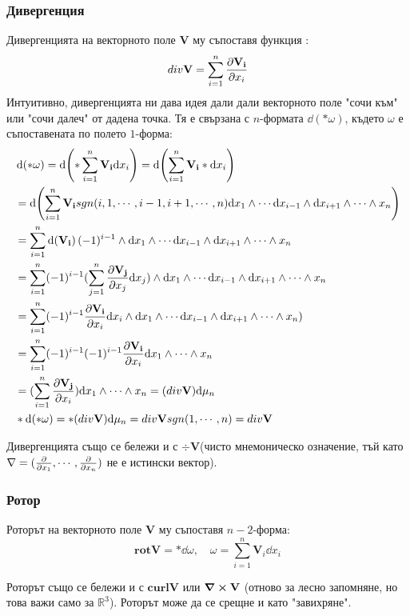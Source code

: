 \documentclass[12pt]{article}
\begin{document}
\begin{large}
\subsubsection*{Дивергенция}
Дивергенцията на векторното поле $\mathbf{V}$ му съпоставя функция :
\[
div \mathbf{V} = \sum_{i=1}^{n} \pdv{\mathbf{V_i}}{x_i}
\] 
Интуитивно, дивергенцията ни дава идея дали дали векторното поле "сочи към" или "сочи далеч" от дадена точка. Тя е свързана с $n$-формата $\dd (\ast \omega)$, където $\omega$ е съпоставената по полето $1$-форма:
\begin{align*}
&\dd (\ast \omega) = \dd ( \ast \sum_{i=1}^{n} \mathbf{V_i} \dd x_i ) = \dd( \sum_{i=1}^{n} \mathbf{V_i} \ast \dd x_i ) \\
&= \dd(\sum_{i=1}^{n} \mathbf{V_i} sgn(i,1,\cdots,i-1,i+1,\cdots,n) \dd x_1 \wedge \cdots \dd x_{i-1} \wedge \dd x_{i+1} \wedge \cdots \wedge x_n) \\
&=\sum_{i=1}^{n} \dd(\mathbf{V_i}) (-1)^{i-1} \wedge \dd x_1 \wedge \cdots \dd x_{i-1} \wedge \dd x_{i+1} \wedge \cdots \wedge x_n \\
&=\sum_{i=1}^{n} (-1)^{i-1}  (\sum_{j=1}^{n} \pdv{\mathbf{V_j}}{x_j} \dd x_j ) \wedge \dd x_1 \wedge \cdots \dd x_{i-1} \wedge \dd x_{i+1} \wedge \cdots \wedge x_n \\
&=\sum_{i=1}^{n} (-1)^{i-1} \pdv{\mathbf{V_i}}{x_i} \dd x_i  \wedge \dd x_1 \wedge \cdots \dd x_{i-1} \wedge \dd x_{i+1} \wedge \cdots \wedge x_n) \\
&=\sum_{i=1}^{n} (-1)^{i-1}(-1)^{i-1} \pdv{\mathbf{V_i}}{x_i}  \dd x_1 \wedge \cdots \wedge x_n \\
&=(\sum_{i=1}^{n} \pdv{\mathbf{V_j}}{x_i})  \dd x_1 \wedge \cdots \wedge x_n = (div \mathbf{V}) \dd \mu_n \\
&\ast \dd (\ast \omega) = \ast (div \mathbf{V}) \dd \mu_n = div \mathbf{V} sgn(1,\cdots,n) = div \mathbf{V}
\end{align*}


Дивергенцията също се бележи и с $\div \mathbf{V}$(чисто мнемоническо означение, тъй като $\nabla=(\pdv{}{x_1},\cdots,\pdv{}{x_n})$ не е истински вектор).

\subsubsection*{Ротор}
Роторът на векторното поле $\mathbf{V}$ му съпоставя $n-2$-форма:
\[
\mathbf{rot} \mathbf{V} = \ast \dd \omega, \quad 
\omega=\sum_{i=1}^n \mathbf{V}_i \dd x_i
\] 

Роторът също се бележи и с $\mathbf{curl} \mathbf{V}$ или $\curl \mathbf{V}$ (отново за лесно запомняне, но това важи само за $\mathbb{R}^3$). Роторът може да се срещне и като "завихряне".


\end{large}
\end{document}
